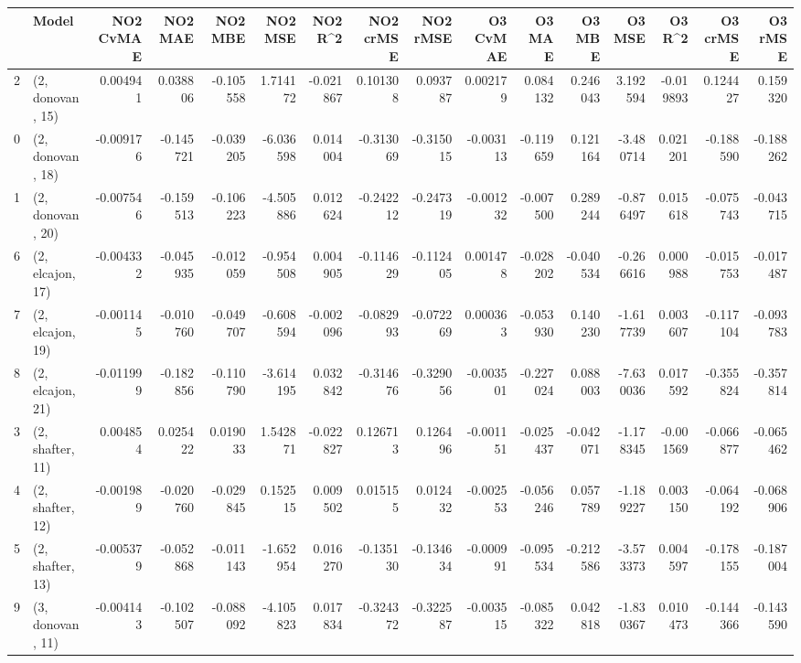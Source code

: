 \begin{tabular}{llrrrrrrrrrrrrrr}
\toprule
{} &             Model &  NO2 CvMAE &   NO2 MAE &   NO2 MBE &    NO2 MSE &   NO2 R\textasciicircum2 &  NO2 crMSE &  NO2 rMSE &  O3 CvMAE &    O3 MAE &    O3 MBE &     O3 MSE &    O3 R\textasciicircum2 &  O3 crMSE &   O3 rMSE \\
\midrule
2  &  (2, donovan, 15) &   0.004941 &  0.038806 & -0.105558 &   1.714172 & -0.021867 &   0.101308 &  0.093787 &  0.002179 &  0.084132 &  0.246043 &   3.192594 & -0.019893 &  0.124427 &  0.159320 \\
0  &  (2, donovan, 18) &  -0.009176 & -0.145721 & -0.039205 &  -6.036598 &  0.014004 &  -0.313069 & -0.315015 & -0.003113 & -0.119659 &  0.121164 &  -3.480714 &  0.021201 & -0.188590 & -0.188262 \\
1  &  (2, donovan, 20) &  -0.007546 & -0.159513 & -0.106223 &  -4.505886 &  0.012624 &  -0.242212 & -0.247319 & -0.001232 & -0.007500 &  0.289244 &  -0.876497 &  0.015618 & -0.075743 & -0.043715 \\
6  &  (2, elcajon, 17) &  -0.004332 & -0.045935 & -0.012059 &  -0.954508 &  0.004905 &  -0.114629 & -0.112405 &  0.001478 & -0.028202 & -0.040534 &  -0.266616 &  0.000988 & -0.015753 & -0.017487 \\
7  &  (2, elcajon, 19) &  -0.001145 & -0.010760 & -0.049707 &  -0.608594 & -0.002096 &  -0.082993 & -0.072269 &  0.000363 & -0.053930 &  0.140230 &  -1.617739 &  0.003607 & -0.117104 & -0.093783 \\
8  &  (2, elcajon, 21) &  -0.011999 & -0.182856 & -0.110790 &  -3.614195 &  0.032842 &  -0.314676 & -0.329056 & -0.003501 & -0.227024 &  0.088003 &  -7.630036 &  0.017592 & -0.355824 & -0.357814 \\
3  &  (2, shafter, 11) &   0.004854 &  0.025422 &  0.019033 &   1.542871 & -0.022827 &   0.126713 &  0.126496 & -0.001151 & -0.025437 & -0.042071 &  -1.178345 & -0.001569 & -0.066877 & -0.065462 \\
4  &  (2, shafter, 12) &  -0.001989 & -0.020760 & -0.029845 &   0.152515 &  0.009502 &   0.015155 &  0.012432 & -0.002553 & -0.056246 &  0.057789 &  -1.189227 &  0.003150 & -0.064192 & -0.068906 \\
5  &  (2, shafter, 13) &  -0.005379 & -0.052868 & -0.011143 &  -1.652954 &  0.016270 &  -0.135130 & -0.134634 & -0.000991 & -0.095534 & -0.212586 &  -3.573373 &  0.004597 & -0.178155 & -0.187004 \\
9  &  (3, donovan, 11) &  -0.004143 & -0.102507 & -0.088092 &  -4.105823 &  0.017834 &  -0.324372 & -0.322587 & -0.003515 & -0.085322 &  0.042818 &  -1.830367 &  0.010473 & -0.144366 & -0.143590 \\

\end{tabular}
